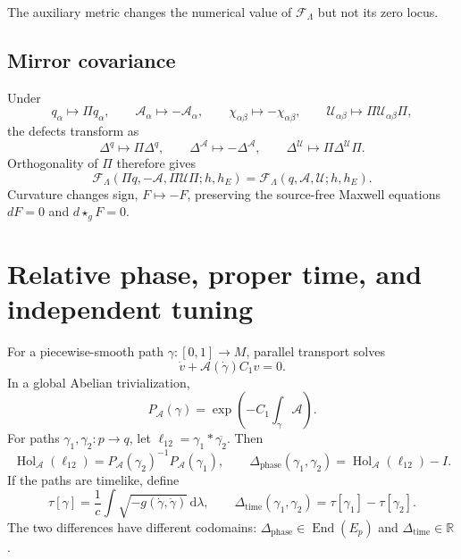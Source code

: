 \documentclass[10pt,oneside]{article}
\theoremstyle{plaincompact}
\theoremstyle{definitioncompact}
\newcommand{\R}{\mathbb R}
\newcommand{\Hol}{\operatorname{Hol}}
\newcommand{\Ad}{\mathcal A}
\newcommand{\cF}{\mathcal F}
\newcommand{\cU}{\mathcal U}
\newcommand{\dd}{\,\mathrm d}
\begin{document}
The auxiliary metric changes the numerical value of $\cF_\Lambda$ but not its
zero locus.

\subsection{Mirror covariance}

Under
\begin{equation}\label{eq:mirroraction}
q_\alpha\mapsto\Pi q_\alpha,\qquad
\Ad_\alpha\mapsto-\Ad_\alpha,\qquad
\chi_{\alpha\beta}\mapsto-\chi_{\alpha\beta},\qquad
\cU_{\alpha\beta}\mapsto\Pi\cU_{\alpha\beta}\Pi,
\end{equation}
the defects transform as
\begin{equation}\label{eq:mirrordefects}
\Delta^q\mapsto\Pi\Delta^q,\qquad
\Delta^{\Ad}\mapsto-\Delta^{\Ad},
\qquad \Delta^{\cU}\mapsto\Pi\Delta^{\cU}\Pi.
\end{equation}
Orthogonality of $\Pi$ therefore gives
\begin{equation}\label{eq:mirrorfunctional}
\cF_\Lambda(\Pi q,-\Ad,\Pi\cU\Pi;h,h_E)
=\cF_\Lambda(q,\Ad,\cU;h,h_E).
\end{equation}
Curvature changes sign, $F\mapsto-F$, preserving the source-free Maxwell
equations $dF=0$ and $d\star_gF=0$.

\section{Relative phase, proper time, and independent tuning}

For a piecewise-smooth path $\gamma:[0,1]\to M$, parallel transport solves
\begin{equation}\label{eq:paralleltransport}
\dot v+\Ad(\dot\gamma)C_1v=0.
\end{equation}
In a global Abelian trivialization,
\begin{equation}\label{eq:pathtransport}
P_\Ad(\gamma)=\exp\!\left(-C_1\int_\gamma\Ad\right).
\end{equation}
For paths $\gamma_1,\gamma_2:p\to q$, let
$\ell_{12}=\gamma_1*\overline{\gamma_2}$.  Then
\begin{equation}\label{eq:relativeholonomy}
\Hol_\Ad(\ell_{12})=P_\Ad(\gamma_2)^{-1}P_\Ad(\gamma_1),
\qquad
\Delta_{\mathrm{phase}}(\gamma_1,\gamma_2)
=\Hol_\Ad(\ell_{12})-I.
\end{equation}
If the paths are timelike, define
\begin{equation}\label{eq:propertime}
\tau[\gamma]=\frac1c\int
\sqrt{-g(\dot\gamma,\dot\gamma)}\dd\lambda,
\qquad
\Delta_{\mathrm{time}}(\gamma_1,\gamma_2)
=\tau[\gamma_1]-\tau[\gamma_2].
\end{equation}
The two differences have different codomains:
$\Delta_{\mathrm{phase}}\in\operatorname{End}(E_p)$ and
$\Delta_{\mathrm{time}}\in\R$.
\end{document}

